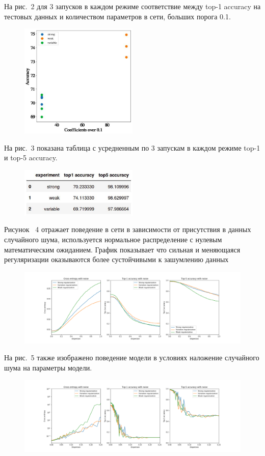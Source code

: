 \documentclass[12pt,twoside]{article}
\begin{document}
На рис.~2 для 3 запусков в каждом режиме соответствие между top-1 accuracy на тестовых данных и количеством параметров в сети, больших порога 0.1.

\begin{figure}[!htbp]
	\centering
	\includegraphics[width=0.5\textwidth]{pic/accuracy.jpeg}
	\caption{}
	\label{}
\end{figure}

На рис.~3 показана таблица с усредненным по 3 запускам в каждом режиме top-1 и top-5 accuracy.

\begin{figure}[!htbp]
	\centering
	\includegraphics[width=0.5\textwidth]{pic/accuracy_table.jpeg}
	\caption{}
	\label{}
\end{figure}

Рисунок ~4 отражает поведение в сети в зависимости от присутствия в данных случайного шума, используется нормальное распределение с нулевым математическим ожиданием.
График показывает что сильная и меняющаяся регуляризации оказываются более сустойчивыми к зашумлению данных
\begin{figure}[htbp]
	\centering
    \includegraphics[width=1\linewidth]{pic/noise1_graph.pdf}
	\caption{}
	\label{}
\end{figure}

На рис.~5 также изображено поведение модели в условиях наложение случайного шума на параметры модели.
\begin{figure}[htbp]
	\centering
	\includegraphics[width=1\linewidth]{pic/noise_params_graph.pdf}
	\caption{}
	\label{}
\end{figure}




\end{document}
